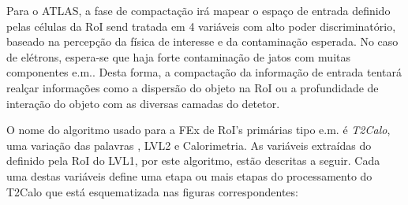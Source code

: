 Para o ATLAS, a fase de compactação irá mapear o espaço de entrada definido
pelas células da RoI send tratada em 4 variáveis com alto poder
discriminatório, baseado na percepção da física de interesse e da contaminação
esperada. No caso de elétrons, espera-se que haja forte contaminação de jatos
com muitas componentes e.m.. Desta forma, a compactação da informação de entrada
tentará realçar informações como a dispersão do objeto na RoI ou a
profundidade de interação do objeto com as diversas camadas do detetor.

O nome do algoritmo usado para a FEx de RoI's primárias tipo e.m. é
\emph{T2Calo}, uma variação das palavras , LVL2 e
Calorimetria. As variáveis extraídas do  definido pela RoI do
LVL1, por este algoritmo, estão descritas a seguir. Cada uma destas variáveis
define uma etapa ou mais etapas do processamento do T2Calo que está
esquematizada nas figuras correspondentes:

